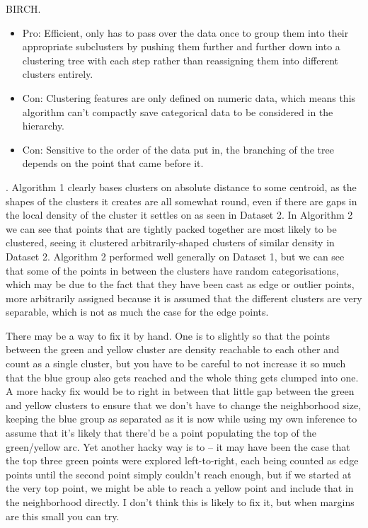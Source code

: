 \documentclass[newpage]{homework}
\begin{document}
BIRCH.
\begin{itemize}
    \item Pro: Efficient, only has to pass over the data once to group them into their appropriate subclusters by pushing them further and further down into a clustering tree with each step rather than reassigning them into different clusters entirely.
    \item Con: Clustering features are only defined on numeric data, which means this algorithm can't compactly save categorical data to be considered in the hierarchy.
    \item Con: Sensitive to the order of the data put in, the branching of the tree depends on the point that came before it.
\end{itemize}

. Algorithm 1 clearly bases clusters on absolute distance to some centroid, as the shapes of the clusters it creates are all somewhat round, even if there are gaps in the local density of the cluster it settles on as seen in Dataset 2. In Algorithm 2 we can see that points that are tightly packed together are most likely to be clustered, seeing it clustered arbitrarily-shaped clusters of similar density in Dataset 2. Algorithm 2 performed well generally on Dataset 1, but we can see that some of the points in between the clusters have random categorisations, which may be due to the fact that they have been cast as edge or outlier points, more arbitrarily assigned because it is assumed that the different clusters are very separable, which is not as much the case for the edge points.

There may be a way to fix it by hand. One is to  slightly so that the points between the green and yellow cluster are density reachable to each other and count as a single cluster, but you have to be careful to not increase it so much that the blue group also gets reached and the whole thing gets clumped into one. A more hacky fix would be to  right in between that little gap between the green and yellow clusters to ensure that we don't have to change the neighborhood size, keeping the blue group as separated as it is now while using my own inference to assume that it's likely that there'd be a point populating the top of the green/yellow arc. Yet another hacky way is to -- it may have been the case that the top three green points were explored left-to-right, each being counted as edge points until the second point simply couldn't reach enough, but if we started at the very top point, we might be able to reach a yellow point and include that in the neighborhood directly. I don't think this is likely to fix it, but when margins are this small you can try.
\end{document}
